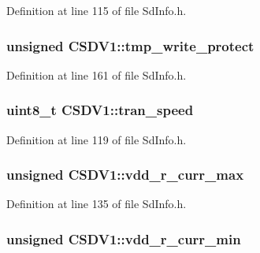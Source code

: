 Definition at line 115 of file Sd\+Info.\+h.

\subsubsection[{\texorpdfstring{tmp\+\_\+write\+\_\+protect}{tmp\_write\_protect}}]{\setlength{\rightskip}{0pt plus 5cm}unsigned C\+S\+D\+V1\+::tmp\+\_\+write\+\_\+protect}\hypertarget{struct_c_s_d_v1_a79be71efc43a4706a1f1fd6023f574db}{}\label{struct_c_s_d_v1_a79be71efc43a4706a1f1fd6023f574db}


Definition at line 161 of file Sd\+Info.\+h.

\subsubsection[{\texorpdfstring{tran\+\_\+speed}{tran\_speed}}]{\setlength{\rightskip}{0pt plus 5cm}uint8\+\_\+t C\+S\+D\+V1\+::tran\+\_\+speed}\hypertarget{struct_c_s_d_v1_a4f25d134cabce66589599a344c19a868}{}\label{struct_c_s_d_v1_a4f25d134cabce66589599a344c19a868}


Definition at line 119 of file Sd\+Info.\+h.

\subsubsection[{\texorpdfstring{vdd\+\_\+r\+\_\+curr\+\_\+max}{vdd\_r\_curr\_max}}]{\setlength{\rightskip}{0pt plus 5cm}unsigned C\+S\+D\+V1\+::vdd\+\_\+r\+\_\+curr\+\_\+max}\hypertarget{struct_c_s_d_v1_aa4abe46e7b1435c6fd10d81e7e896a4b}{}\label{struct_c_s_d_v1_aa4abe46e7b1435c6fd10d81e7e896a4b}


Definition at line 135 of file Sd\+Info.\+h.

\subsubsection[{\texorpdfstring{vdd\+\_\+r\+\_\+curr\+\_\+min}{vdd\_r\_curr\_min}}]{\setlength{\rightskip}{0pt plus 5cm}unsigned C\+S\+D\+V1\+::vdd\+\_\+r\+\_\+curr\+\_\+min}\hypertarget{struct_c_s_d_v1_afec7601986197bca644c0d8a0a15792b}{}\label{struct_c_s_d_v1_afec7601986197bca644c0d8a0a15792b}


